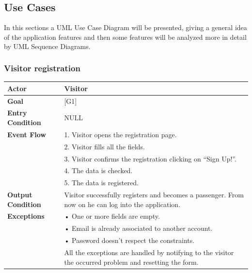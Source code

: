 \documentclass{article}
\begin{document}
\subsection{Use Cases}
In this sections a UML Use Case Diagram will be presented, giving a general idea of the application features and then some features will be analyzed more in detail by UML Sequence Diagrams.  

\subsubsection{Visitor registration}
\begin{tabular}{| l | p{8cm} |}
\hline
\textbf{Actor}      &       Visitor \\
\hline
\textbf{Goal}       &       [G1]\\
\hline
\textbf{Entry Condition} &  NULL\\
\hline
\textbf{Event Flow}     &   1.	Visitor opens the registration page.\\&
                                            2.	Visitor fills all the fields.\\&
                                            3.	Visitor confirms the registration clicking on “Sign Up!”.\\&
                                            4.  The data is checked.\\&
                                            5.	The data is registered.\\
\hline
\textbf{Output Condition} & Visitor successfully registers and becomes a passenger. From now on he can log into the application.\\
\hline
\textbf{Exceptions} &       •   One or more fields are empty.\\& 
                            •	Email is already associated to another account.\\&
                            •	Password doesn't respect the constraints.\\& 
                            All the exceptions are handled by notifying to the visitor the occurred problem and resetting the form.\\
\hline
\end{tabular} 
\end{document}
